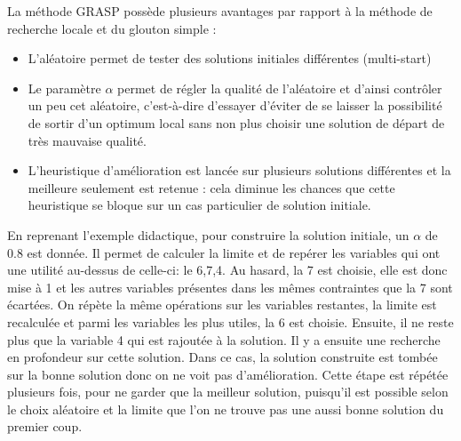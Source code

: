La méthode GRASP possède plusieurs avantages par rapport à la méthode de recherche locale et du glouton simple :
\begin{itemize}
\item L'aléatoire permet de tester des solutions initiales différentes (multi-start)
\item Le paramètre $\alpha$ permet de régler la qualité de l'aléatoire et d'ainsi contrôler un peu cet aléatoire, c'est-à-dire d'essayer d'éviter de se laisser la possibilité de sortir d'un optimum local sans non plus choisir une solution de départ de très mauvaise qualité.
\item L'heuristique d'amélioration est lancée sur plusieurs solutions différentes et la meilleure seulement est retenue : cela diminue les chances que cette heuristique se bloque sur un cas particulier de solution initiale.
\end{itemize}


En reprenant l'exemple didactique, pour construire la solution initiale, un $\alpha$ de 0.8 est donnée. Il permet de calculer la limite et de repérer les variables qui ont une utilité au-dessus de celle-ci: le 6,7,4. Au hasard, la 7 est choisie, elle est donc mise à 1 et les autres variables présentes dans les mêmes contraintes que la 7 sont écartées. On répète la même opérations sur les variables restantes, la limite est recalculée et parmi les variables les plus utiles, la 6 est choisie. Ensuite, il ne reste plus que la variable 4 qui est rajoutée à la solution. Il y a ensuite une recherche en profondeur sur cette solution. Dans ce cas, la solution construite est tombée sur la bonne solution donc on ne voit pas d'amélioration. Cette étape est répétée plusieurs fois, pour ne garder que la meilleur solution, puisqu'il est possible selon le choix aléatoire et la limite que l'on ne trouve pas une aussi bonne solution du premier coup.


\vspace{5mm}
\noindent
{}
\vspace{2mm}


